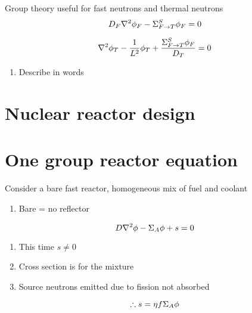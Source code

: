 \documentclass[aspectratio=1610,pdftex,dvipsnames,compress,xcolor={dvipsnames}]{beamer}
\begin{document}
\begin{frame}{Group theory useful for fast neutrons and thermal neutrons}
    \begin{equation}
        \LARGE
        D_F \nabla^2 \phi_F - \Sigma_{F \rightarrow T}^S \phi_F = 0
    \end{equation}

    \begin{equation}
        \LARGE
        \nabla^2 \phi_T - \frac{1}{L^2} \phi_T + \frac{\Sigma_{F \rightarrow T}^S \phi_F}{D_T} = 0
    \end{equation}

    \vspace*{\fill}

    \begin{enumerate}[series=outerlist,topsep=0pt,itemsep=21pt,leftmargin=*,label=(\arabic*)]
        \item[]Describe in words
    \end{enumerate}
\end{frame}


\section{Nuclear reactor design}
\section{One group reactor equation}


\addtocounter{framenumber}{-2} 
\begin{frame}{Consider a bare fast reactor, homogeneous mix of fuel and coolant}
    \begin{enumerate}[series=outerlist,topsep=0pt,itemsep=21pt,leftmargin=*,label=(\arabic*)]
        \item[]Bare = no reflector
    \end{enumerate}

    \vspace*{\fill}

    \begin{equation}
        \LARGE
        D \nabla^2 \phi - \Sigma_A \phi + s = 0
    \end{equation}

    \vspace*{\fill}

    \begin{enumerate}[series=outerlist,topsep=0pt,itemsep=21pt,leftmargin=*,label=(\arabic*)]
        \item[]This time $s \neq 0$
        \item[]Cross section is for the mixture
        \item[]Source neutrons emitted due to fission not absorbed
    \end{enumerate}

    \vspace*{\fill}

    \begin{equation}
        \LARGE
        \therefore s = \eta f \Sigma_A \phi
    \end{equation}
\end{frame}
\end{document}
